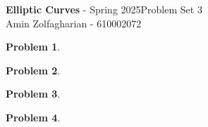 \documentclass[12pt]{article}
\newcommand{\customanswer}[1]{%
\begin{problem}
\end{problem}

}
\newtheorem{problem}{Problem}
\begin{document}
\noindent \textbf{Elliptic Curves} - Spring 2025\hfill Problem Set 3\\
Amin Zolfagharian - 610002072

\hrulefill

\customanswer{1}
\customanswer{2}
\customanswer{3}
\customanswer{4}
\end{document}
